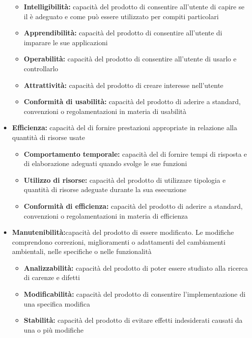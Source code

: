 \documentclass[12pt,a4paper]{article}
\begin{document}
\begin{itemize}
	\begin{itemize}
		\item \textbf{Intelligibilità:} capacità del prodotto   di consentire all'utente di capire se il   è adeguato e come può essere utilizzato per compiti	particolari
		\item \textbf{Apprendibilità:} capacità del prodotto   di consentire all'utente di imparare le sue applicazioni
		\item \textbf{Operabilità:} capacità del prodotto   di consentire all'utente di usarlo e controllarlo
		\item \textbf{Attrattività:} capacità del prodotto   di creare interesse nell'utente
		\item \textbf{Conformità di usabilità:} capacità del prodotto   di aderire a standard, convenzioni o regolamentazioni in materia di usabilità
	\end{itemize}
	\item \textbf{Efficienza:} capacità del   di fornire prestazioni appropriate in relazione alla quantità di risorse usate
	\begin{itemize}
		\item \textbf{Comportamento temporale:} capacità del   di fornire tempi di risposta e di elaborazione adeguati quando svolge le sue funzioni
		\item \textbf{Utilizzo di risorse:} capacità del prodotto   di utilizzare tipologia e quantità di risorse adeguate durante la sua esecuzione
		\item \textbf{ Conformità di efficienza: } capacità del prodotto   di aderire a standard, convenzioni o regolamentazioni in materia di efficienza
	\end{itemize}
	\item \textbf{Manutenibilità:}capacità del prodotto   di essere modificato. Le modifiche comprendono correzioni, miglioramenti o adattamenti del   cambiamenti ambientali, nelle specifiche o nelle funzionalità
	\begin{itemize}
		\item \textbf{Analizzabilità:} capacità del prodotto   di poter essere studiato alla ricerca di carenze e difetti
		\item \textbf{Modificabilità: }capacità del prodotto   di consentire l'implementazione di una specifica modifica
		\item \textbf{ Stabilità:} capacità del prodotto   di evitare effetti indesiderati causati da una o più modifiche

\end{itemize}
\end{itemize}
\end{document}
